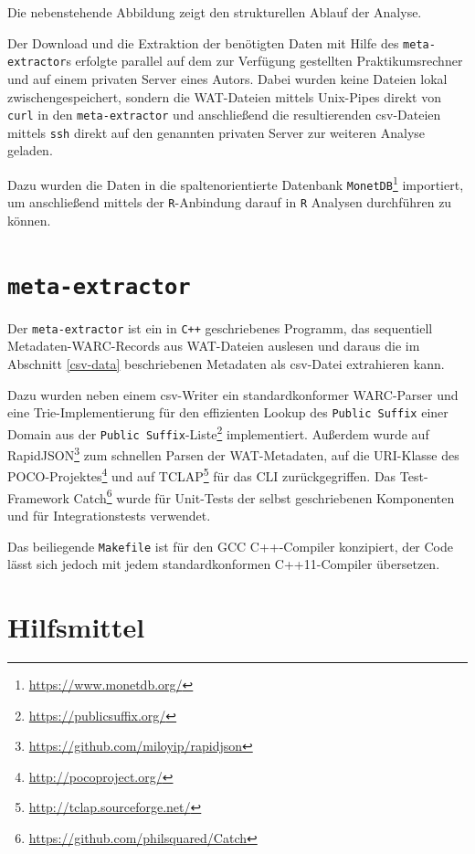 \documentclass[a4paper,12pt,titlepage=false]{scrreprt}
\begin{document}
Die nebenstehende Abbildung zeigt den strukturellen Ablauf der Analyse.

Der Download und die Extraktion der benötigten Daten mit Hilfe des
\texttt{meta-extractor}s erfolgte parallel auf dem zur Verfügung gestellten
Praktikumsrechner und auf einem privaten Server eines Autors. Dabei wurden keine
Dateien lokal zwischengespeichert, sondern die WAT-Dateien mittels Unix-Pipes
direkt von \texttt{curl} in den \texttt{meta-extractor} und anschließend die
resultierenden csv-Dateien mittels \texttt{ssh} direkt auf den genannten
privaten Server zur weiteren Analyse geladen.

Dazu wurden die Daten in die spaltenorientierte Datenbank
\texttt{MonetDB}\footnote{\url{https://www.monetdb.org/}} importiert, um
anschließend mittels der \texttt{R}-Anbindung darauf in \texttt{R} Analysen
durchführen zu können.

\section{\texttt{meta-extractor}}

Der \texttt{meta-extractor} ist ein in \texttt{C++} geschriebenes Programm,
das sequentiell Metadaten-WARC-Records aus WAT-Dateien auslesen und daraus
die im Abschnitt \ref{csv-data} beschriebenen Metadaten als csv-Datei extrahieren
kann.

Dazu wurden neben einem csv-Writer ein standardkonformer WARC-Parser und eine
Trie-Implementierung für den effizienten Lookup des \texttt{Public Suffix} einer
Domain aus der \texttt{Public Suffix}-Liste\footnote{\url{https://publicsuffix.org/}} implementiert. Außerdem wurde auf RapidJSON\footnote{\url{https://github.com/miloyip/rapidjson}}
zum schnellen Parsen der WAT-Metadaten, auf die URI-Klasse des
POCO-Projektes\footnote{\url{http://pocoproject.org/}} und auf
TCLAP\footnote{\url{http://tclap.sourceforge.net/}} für das CLI zurückgegriffen. Das Test-Framework Catch\footnote{\url{https://github.com/philsquared/Catch}} wurde für Unit-Tests der selbst geschriebenen Komponenten und für Integrationstests verwendet.

Das beiliegende \texttt{Makefile} ist für den GCC C++-Compiler konzipiert, der Code lässt sich jedoch mit jedem standardkonformen C++11-Compiler übersetzen.

\section{Hilfsmittel}
\end{document}
